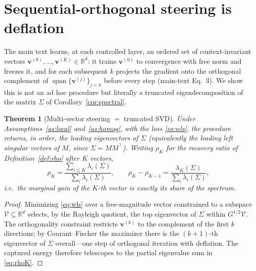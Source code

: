 \documentclass[11pt]{article}
\newtheorem{theorem}{Theorem}[section]
\newcommand{\R}{\mathbb{R}}
\newcommand{\bv}{\mathbf{v}}
\begin{document}
\section{Sequential-orthogonal steering is deflation}\label{sec:multi}
The main text learns, at each controlled layer, an ordered set of context-invariant vectors
$\bv^{(0)},\dots,\bv^{(K)}\in\R^d$: it trains $\bv^{(0)}$ to convergence with free norm and freezes
it, and for each subsequent $k$ projects the gradient onto the orthogonal complement of
$\operatorname{span}\{\bv^{(j)}\}_{j<k}$ before every step (main-text Eq.~3). We show this is
not an ad hoc procedure but literally a truncated eigendecomposition of the matrix $\Sigma$ of
Corollary~\ref{cor:spectral}.

\begin{theorem}[Multi-vector steering $=$ truncated SVD]\label{thm:svd}
Under Assumptions~\ref{as:local} and~\ref{as:homog}, with the loss \eqref{eq:wls}, the procedure
returns, in order, the leading eigenvectors of $\Sigma$ (equivalently the leading left singular
vectors of $M$, since $\Sigma=MM^\top$). Writing $\rho_K$ for the recovery ratio of
Definition~\ref{def:rho} after $K$ vectors,
\begin{equation}\label{eq:rhoK}
\rho_K=\frac{\sum_{i\le K}\lambda_i(\Sigma)}{\sum_i\lambda_i(\Sigma)},
\qquad \rho_K-\rho_{K-1}=\frac{\lambda_K(\Sigma)}{\sum_i\lambda_i(\Sigma)} ,
\end{equation}
i.e.\ the marginal gain of the $K$-th vector is exactly its share of the spectrum.
\end{theorem}
\begin{proof}
Minimizing \eqref{eq:wls} over a free-magnitude vector constrained to a subspace
$\mathcal V\subseteq\R^d$ selects, by the Rayleigh quotient, the top eigenvector of $\Sigma$ within
$G^{1/2}\mathcal V$. The orthogonality constraint restricts $\bv^{(k)}$ to the complement of the
first $k$ directions; by Courant--Fischer the maximizer there is the $(k{+}1)$-th eigenvector of
$\Sigma$ overall---one step of orthogonal iteration with deflation. The captured energy therefore
telescopes to the partial eigenvalue sum in \eqref{eq:rhoK}.
\end{proof}
\end{document}
